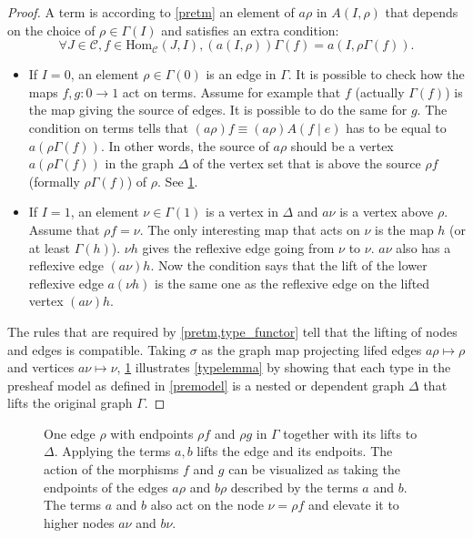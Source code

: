 \documentclass[12pt,a4paper,twoside,xetex]{book} %
\newcommand{\homo}[3]{\text{Hom}_{#1}\left(#2,#3\right)}
\begin{document}
\begin{proof}
A term is according to \cref{pretm} an element of $a\rho$ in $A(I,\rho)$ that 
depends on the choice of $\rho \in \Gamma (I)$ and satisfies an extra 
condition: $$\forall J \in \mathcal{C}, f \in \homo{\mathcal{C}}{J}{I}, 
(a(I,\rho))\Gamma(f)= a(I,\rho \Gamma (f)).$$ 
\begin{itemize}

\item If $I=0$, an element $\rho \in \Gamma (0)$ is an edge in $\Gamma$. It is 
possible to check how the maps $f,g:0\rightarrow 1$ act on terms. Assume for 
example that $f$ (actually $\Gamma(f)$)  is the map giving the source of edges. 
It is possible to do the same for $g$. The condition on terms tells that 
$(a\rho)f \equiv (a \rho)A(f \mid e)$ has to be equal to $a(\rho \Gamma (f))$. 
In other words, the source of $a\rho$ should be a vertex $a(\rho \Gamma (f))$ 
in the graph $\Delta$ of the vertex set that is above the source $\rho f$ 
(formally $\rho \Gamma (f)$) of $\rho$. See \cref{depgraphdiag}.


\item If $I = 1$, an  element $\nu \in \Gamma (1)$ is a vertex in $\Delta$ 
and $a\nu$ is a vertex above $\rho$. Assume that $\rho f = \nu$. The only 
interesting map that acts on $\nu$ is the map $h$ (or at least $\Gamma (h)$). 
$\nu h$ gives the reflexive edge going from $\nu$ to $\nu$. $a\nu$ also has a 
reflexive edge $(a\nu)h$. Now the condition says that the lift of the lower 
reflexive edge $a (\nu h)$ is the same one as the reflexive edge on the lifted 
vertex $(a \nu) h$. 
\end{itemize}

The rules that are required by \cref{pretm,type_functor} tell that the lifting 
of nodes and edges is compatible. Taking $\sigma$ as the graph map projecting lifed edges $a\rho \mapsto \rho$ and vertices $a\nu \mapsto \nu$, \cref{depgraphdiag} illustrates  \cref{typelemma} by showing that each type in the presheaf model as defined in 
\cref{premodel} is a nested or dependent graph $\Delta$ that lifts 
the original graph $\Gamma$.
\end{proof}


\begin{figure}\label{depgraphdiag}
\begin{center} 

\end{center}
\caption{One edge $\rho$ with endpoints $\rho f$ and $\rho g$ in $\Gamma$ together with its lifts to $\Delta$. Applying the terms $a,b$ lifts the edge and its endpoits. The action of the morphisms $f$ and $g$ can be visualized as taking the endpoints of the edges $a\rho$
and $b\rho$ described by the terms $a$ and $b$. The terms $a$ and $b$ also act 
on the node $\nu = \rho f$ and elevate it to higher nodes $a\nu$ and $b\nu$. 
}
\end{figure}
\end{document}
